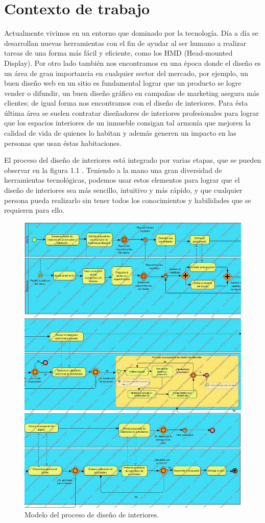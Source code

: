 \section{Contexto de trabajo}

Actualmente vivimos en un entorno que dominado por la tecnología. Día a día se desarrollan nuevas herramientas con el fin de ayudar al ser humano a realizar tareas de una forma más fácil y eficiente, como los HMD (Head-mounted Display)\cite{B15}.
Por otro lado también nos encontramos en una época donde el diseño es un área de gran importancia en cualquier sector del mercado, por ejemplo, un buen diseño web en un sitio es fundamental lograr que un producto se logre vender o difundir, un buen diseño gráfico en campañas de marketing asegura más clientes; de igual forma nos encontramos con el diseño de interiores. Para ésta última área se suelen contratar diseñadores de interiores profesionales para lograr que los espacios interiores de un inmueble consigan tal armonía que mejoren la calidad de vida de quienes lo habitan y además generen un impacto en las personas que usan éstas habitaciones.\par
El proceso del diseño de interiores está integrado por varias etapas, que se pueden observar en la figura 1.1	.
Teniendo a la mano una gran diversidad de herramientas tecnológicas, podemos usar estos elementos para lograr que el diseño de interiores sea más sencillo, intuitivo y más rápido, y que cualquier persona pueda realizarlo sin tener todos los conocimientos y habilidades que se requieren para ello.

\begin{figure}[!h]
	\centering
	\includegraphics[width=17.5cm]{imagenes/marcoteorico/bpmn01.png}
	\caption{Modelo del proceso de diseño de interiores.}
	\label{fig:bpmn_antes}
\end{figure}